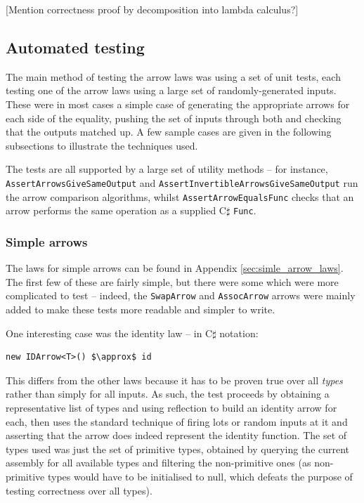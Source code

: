 \documentclass[12pt,twoside,notitlepage]{report}
\begin{document}
[Mention correctness proof by decomposition into lambda calculus?]

\subsection{Automated testing}

The main method of testing the arrow laws was using a set of unit tests, each testing one of the arrow laws using a large set of randomly-generated inputs. These were in most cases a simple case of generating the appropriate arrows for each side of the equality, pushing the set of inputs through both and checking that the outputs matched up. A few sample cases are given in the following subsections to illustrate the techniques used.

The tests are all supported by a large set of utility methods -- for instance, \texttt{AssertArrowsGiveSameOutput} and \texttt{AssertInvertibleArrowsGiveSameOutput} run the arrow comparison algorithms, whilst \texttt{AssertArrowEqualsFunc} checks that an arrow performs the same operation as a supplied C$\sharp$ \texttt{Func}.

\subsubsection{Simple arrows}

The laws for simple arrows can be found in Appendix \ref{sec:simle_arrow_laws}. The first few of these are fairly simple, but there were some which were more complicated to test -- indeed, the \texttt{SwapArrow} and \texttt{AssocArrow} arrows were mainly added to make these tests more readable and simpler to write.

One interesting case was the identity law -- in C$\sharp$ notation:

\begin{lstlisting}[mathescape]
new IDArrow<T>() $\approx$ id
\end{lstlisting}

This differs from the other laws because it has to be proven true over all \textit{types} rather than simply for all inputs. As such, the test proceeds by obtaining a representative list of types and using reflection to build an identity arrow for each, then uses the standard technique of firing lots or random inputs at it and asserting that the arrow does indeed represent the identity function. The set of types used was just the set of primitive types, obtained by querying the current assembly for all available types and filtering the non-primitive ones (as non-primitive types would have to be initialised to null, which defeats the purpose of testing correctness over all types).
\end{document}
